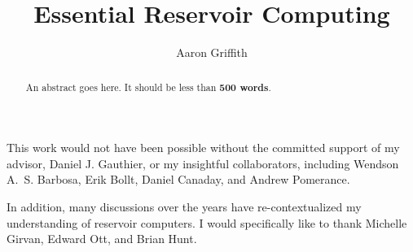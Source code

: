 \documentclass[11pt,draft,phd]{osudiss-2}
\title{Essential Reservoir Computing}
\author{Aaron Griffith}
\begin{document}
\frontmatter

\begin{abstract}
  An abstract goes here. It should be less than \textbf{500 words}.
\end{abstract}

\dedication{For my parents Gregory and Mary Lea, and my brother Nathan.}

\begin{acknowledgments}
  This work would not have been possible without the committed support
  of my advisor, Daniel J. Gauthier, or my insightful collaborators,
  including Wendson A.~S. Barbosa, Erik Bollt, Daniel Canaday, and Andrew
  Pomerance.

  In addition, many discussions over the years have
  re-contextualized my understanding of reservoir computers. I would
  specifically like to thank Michelle Girvan, Edward Ott, and Brian Hunt.
\end{acknowledgments}

\begin{vita}

  \begin{publist}
  \end{publist}

  \begin{fieldsstudy}
  \end{fieldsstudy}
\end{vita}

\tableofcontents 

\clearpage
\listoffigures 

\clearpage
\listoftables 


\mainmatter







\backmatter


\appendix

\end{document}
